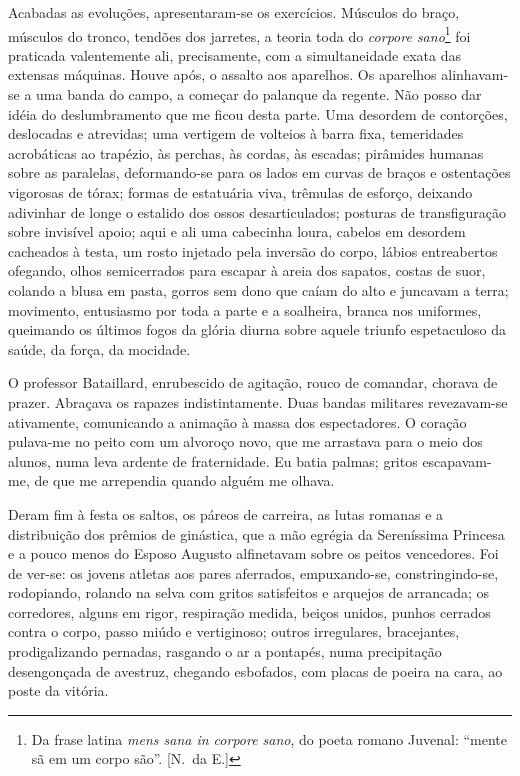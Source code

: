 Acabadas as evoluções, apresentaram{}-se os
exercícios. Músculos do braço, músculos do tronco, tendões dos
jarretes, a teoria toda do \textit{corpore sano}\footnote{ Da frase latina 
\textit{mens sana in corpore sano}, do poeta romano Juvenal: 
``mente sã em um corpo são''. [N.~da E.]} foi praticada valentemente ali,
precisamente, com a simultaneidade exata das extensas máquinas. Houve
após, o assalto aos aparelhos. Os aparelhos alinhavam{}-se a uma banda
do campo, a começar do palanque da regente. Não posso dar idéia do
deslumbramento que me ficou desta parte. Uma desordem de contorções,
deslocadas e atrevidas; uma vertigem de volteios à barra fixa,
temeridades acrobáticas ao trapézio, às perchas, às cordas, às escadas;
pirâmides humanas sobre as paralelas, deformando{}-se para os lados em
curvas de braços e ostentações vigorosas de tórax; formas de estatuária
viva, trêmulas de esforço, deixando adivinhar de longe o estalido dos
ossos desarticulados; posturas de transfiguração sobre invisível apoio;
aqui e ali uma cabecinha loura, cabelos em desordem cacheados à testa,
um rosto injetado pela inversão do corpo, lábios entreabertos ofegando,
olhos semicerrados para escapar à areia dos sapatos, costas de suor,
colando a blusa em pasta, gorros sem dono que caíam do alto e juncavam
a terra; movimento, entusiasmo por toda a parte e a soalheira, branca
nos uniformes, queimando os últimos fogos da glória diurna sobre aquele
triunfo espetaculoso da saúde, da força, da mocidade. 

O professor Bataillard, enrubescido de agitação, rouco de comandar, chorava de
prazer. Abraçava os rapazes indistintamente. Duas bandas militares
revezavam{}-se ativamente, comunicando a animação à massa dos
espectadores. O coração pulava{}-me no peito com um alvoroço novo, que
me arrastava para o meio dos alunos, numa leva ardente de fraternidade.
Eu batia palmas; gritos escapavam{}-me, de que me arrependia quando
alguém me olhava. 

Deram fim à festa os saltos, os páreos de carreira,
as lutas romanas e a distribuição dos prêmios de ginástica, que a mão
egrégia da Sereníssima Princesa e a pouco menos do Esposo Augusto
alfinetavam sobre os peitos vencedores. Foi de ver{}-se: os jovens
atletas aos pares aferrados, empuxando{}-se, constringindo{}-se,
rodopiando, rolando na selva com gritos satisfeitos e arquejos de
arrancada; os corredores, alguns em rigor, respiração medida, beiços
unidos, punhos cerrados contra o corpo, passo miúdo e vertiginoso;
outros irregulares, bracejantes, prodigalizando pernadas, rasgando o ar
a pontapés, numa precipitação desengonçada de avestruz, chegando
esbofados, com placas de poeira na cara, ao poste da vitória. 


